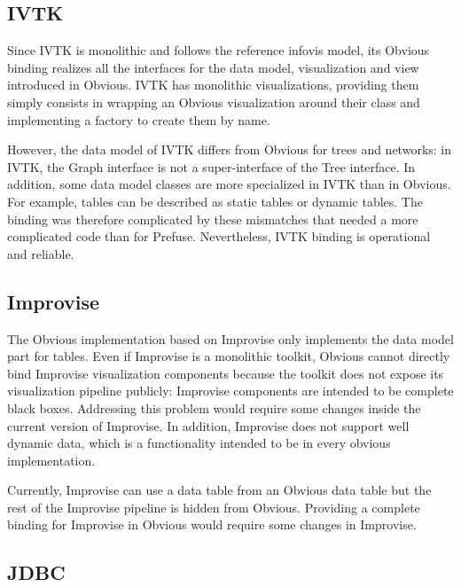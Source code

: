
\subsection{IVTK}

Since IVTK is monolithic and follows the reference
infovis model, its Obvious binding realizes all the
interfaces for the data model, visualization and view introduced in
Obvious. IVTK has monolithic visualizations, providing
them simply consists in wrapping an Obvious visualization around their
class and implementing a factory to create them by name.

However, the data model of IVTK differs from Obvious
for trees and networks: in IVTK, the Graph interface is
not a super-interface of the Tree interface.  In addition, some data
model classes are more specialized in IVTK than in
Obvious.  For example, tables can be described as static tables or
dynamic tables.  The binding was therefore complicated by these
mismatches that needed a more complicated code than for Prefuse.
Nevertheless, IVTK binding is operational and
reliable.

\subsection{Improvise}

The Obvious implementation based on Improvise only
implements the data model part for tables.  Even if Improvise is a
monolithic toolkit, Obvious cannot directly bind Improvise
visualization components because the toolkit does not expose its
visualization pipeline publicly: Improvise components are intended to
be complete black boxes.  Addressing this problem would require some
changes inside the current version of Improvise. In addition,
Improvise does not support well dynamic data, which is a functionality
intended to be in every obvious implementation.

Currently, Improvise can use a data table from an Obvious data table
but the rest of the Improvise pipeline is hidden from
Obvious. Providing a complete binding for Improvise in Obvious would
require some changes in Improvise.

\subsection{JDBC}


